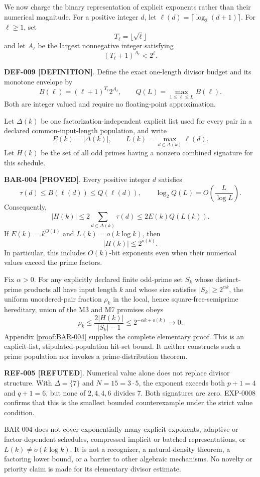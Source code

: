 \documentclass[11pt]{article}
\newcommand{\claimstatus}[2]{\textbf{#1 [#2]}}
\begin{document}
We now charge the binary representation of explicit exponents rather than
their numerical magnitude. For a positive integer \(d\), let
\(\ell(d)=\lceil\log_2(d+1)\rceil\). For \(\ell\ge1\), set
\[
T_\ell=\lfloor\sqrt\ell\rfloor
\]
and let \(A_\ell\) be the largest nonnegative integer satisfying
\[
(T_\ell+1)^{A_\ell}<2^\ell.
\]

\claimstatus{DEF-009}{DEFINITION}. Define the exact one-length divisor budget
and its monotone envelope by
\[
B(\ell)=(\ell+1)^{T_\ell}2^{A_\ell},
\qquad
Q(L)=\max_{1\le\ell\le L}B(\ell).
\]
Both are integer valued and require no floating-point approximation.

Let \(\Delta(k)\) be one factorization-independent explicit list used for
every pair in a declared common-input-length population, and write
\[
E(k)=|\Delta(k)|,\qquad
L(k)=\max_{d\in\Delta(k)}\ell(d).
\]
Let \(H(k)\) be the set of all odd primes having a nonzero combined signature
for this schedule.

\claimstatus{BAR-004}{PROVED}. Every positive integer \(d\) satisfies
\[
\tau(d)\le B(\ell(d))\le Q(\ell(d)),
\qquad
\log_2Q(L)=O\!\left(\frac{L}{\log L}\right).
\]
Consequently,
\[
|H(k)|
\le2\sum_{d\in\Delta(k)}\tau(d)
\le2E(k)Q(L(k)).
\]
If \(E(k)=k^{O(1)}\) and \(L(k)=o(k\log k)\), then
\[
|H(k)|\le2^{o(k)}.
\]
In particular, this includes \(O(k)\)-bit exponents even when their numerical
values exceed the prime factors.

Fix \(\alpha>0\). For any explicitly declared finite odd-prime set \(S_k\)
whose distinct-prime products all have input length \(k\) and whose size
satisfies \(|S_k|\ge2^{\alpha k}\), the uniform unordered-pair fraction
\(\rho_k\) in the local, hence square-free-semiprime hereditary, union of the
M3 and M7 promises obeys
\[
\rho_k
\le\frac{2|H(k)|}{|S_k|-1}
\le2^{-\alpha k+o(k)}
\longrightarrow0.
\]
Appendix \ref{proof:BAR-004} supplies the complete elementary proof. This is
an explicit-list, stipulated-population hit-set bound. It neither constructs
such a prime population nor invokes a prime-distribution theorem.

\claimstatus{REF-005}{REFUTED}. Numerical value alone does not replace divisor
structure. With \(\Delta=\{7\}\) and \(N=15=3\cdot5\), the exponent exceeds
both \(p+1=4\) and \(q+1=6\), but none of \(2,4,4,6\) divides 7. Both
signatures are zero. EXP-0008 confirms that this is the smallest bounded
counterexample under the strict value condition.

BAR-004 does not cover exponentially many explicit exponents, adaptive or
factor-dependent schedules, compressed implicit or batched representations,
or \(L(k)\not=o(k\log k)\). It is not a recognizer, a natural-density theorem,
a factoring lower bound, or a barrier to other algebraic mechanisms. No
novelty or priority claim is made for its elementary divisor estimate.
\end{document}
